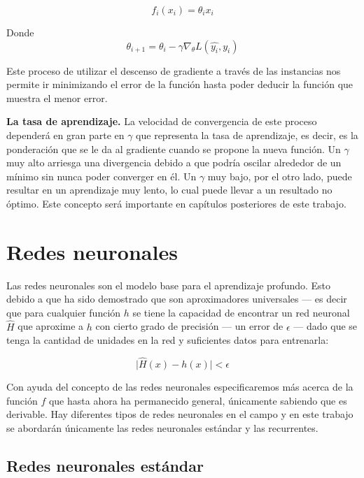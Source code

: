 $$ f_i(x_i) = \theta_i x_i $$

Donde
\begin{equation}
\label{eq:sgdupdate}
\theta_{i + 1} = \theta_{i} - \gamma \nabla_{\theta} L(\hat{y_i}, y_i)
\end{equation}

Este proceso de utilizar el descenso de gradiente a través de las instancias nos permite ir minimizando el error de la función hasta poder deducir la función que muestra el menor error.

\textbf{La tasa de aprendizaje.} La velocidad de convergencia de este proceso dependerá en gran parte en $\gamma$ que representa la tasa de aprendizaje, es decir, es la ponderación que se le da al gradiente cuando se propone la nueva función. Un $\gamma$ muy alto arriesga una divergencia debido a que podría oscilar alrededor de un mínimo sin nunca poder converger en él. Un $\gamma$ muy bajo, por el otro lado, puede resultar en un aprendizaje muy lento, lo cual puede llevar a un resultado no óptimo. Este concepto será importante en capítulos posteriores de este trabajo.

\section{Redes neuronales}

Las redes neuronales son el modelo base para el aprendizaje profundo. Esto debido a que ha sido demostrado que son aproximadores universales \parencite{hornik1989universal} --- es decir que para cualquier función $h$ se tiene la capacidad de encontrar un red neuronal $\hat{H}$ que aproxime a $h$ con cierto grado de precisión --- un error de $\epsilon$ --- dado que se tenga la cantidad de unidades en la red y suficientes datos para entrenarla:

\begin{equation}
\label{eq:universaltheorem}
\vert \hat{H}(x) - h(x) \vert < \epsilon
\end{equation}

Con ayuda del concepto de las redes neuronales especificaremos más acerca de la función $f$ que hasta ahora ha permanecido general, únicamente sabiendo que es derivable. Hay diferentes tipos de redes neuronales en el campo y en este trabajo se abordarán únicamente las redes neuronales estándar y las recurrentes.

\subsection{Redes neuronales estándar}

